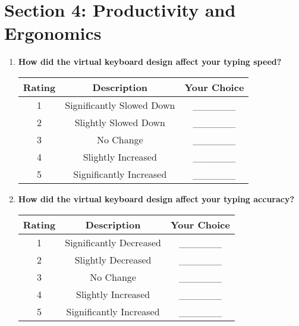 \documentclass[12pt]{article}
\begin{document}
\clearpage 
\section*{Section 4: Productivity and Ergonomics}

\begin{enumerate}
    \item \textbf{How did the virtual keyboard design affect your typing speed?}
    \begin{table}[h!]
        \centering
        \begin{tabular}{|c|c|c|}
            \hline
            \textbf{Rating} & \textbf{Description} & \textbf{Your Choice} \\
            \hline
            1 & Significantly Slowed Down & \_\_\_\_\_\_ \\
            \hline
            2 & Slightly Slowed Down & \_\_\_\_\_\_ \\
            \hline
            3 & No Change & \_\_\_\_\_\_ \\
            \hline
            4 & Slightly Increased & \_\_\_\_\_\_ \\
            \hline
            5 & Significantly Increased & \_\_\_\_\_\_ \\
            \hline
        \end{tabular}
    \end{table}
    
    \item \textbf{How did the virtual keyboard design affect your typing accuracy?}
    \begin{table}[h!]
        \centering
        \begin{tabular}{|c|c|c|}
            \hline
            \textbf{Rating} & \textbf{Description} & \textbf{Your Choice} \\
            \hline
            1 & Significantly Decreased & \_\_\_\_\_\_ \\
            \hline
            2 & Slightly Decreased & \_\_\_\_\_\_ \\
            \hline
            3 & No Change & \_\_\_\_\_\_ \\
            \hline
            4 & Slightly Increased & \_\_\_\_\_\_ \\
            \hline
            5 & Significantly Increased & \_\_\_\_\_\_ \\
            \hline
        \end{tabular}
    \end{table}
    

\end{enumerate}
\end{document}
